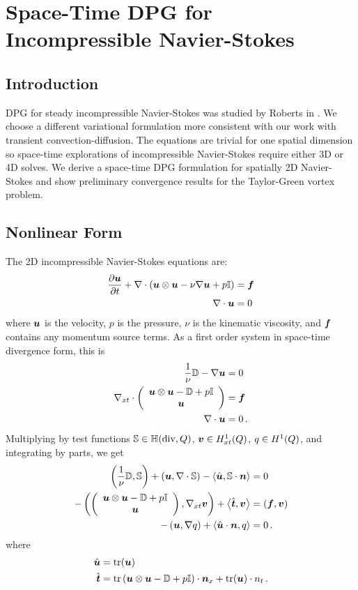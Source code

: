 \documentclass[Dissertation.tex]{subbIles}
\begin{document}
\graphicspath{{../Figures/}}
\chapter{Space-Time DPG for Incompressible Navier-Stokes}
\label{sec:incompressible}

\section{Introduction}
DPG for steady incompressible Navier-Stokes was studied by Roberts in \cite{NateDissertation}.
We choose a different variational formulation more consistent with 
our work with transient convection-diffusion.
The equations are trivial for one spatial dimension so space-time explorations of incompressible
Navier-Stokes require either 3D or 4D solves.
We derive a space-time DPG formulation for spatially 2D Navier-Stokes and show preliminary 
convergence results for the Taylor-Green vortex problem.

\section{Nonlinear Form}
The 2D incompressible Navier-Stokes equations are:
\begin{align*}
  \frac{\partial\boldsymbol u}{\partial t}+\nabla\cdot\left( \boldsymbol u\otimes\boldsymbol u-\nu\nabla\boldsymbol u+p\mathbb{I} \right)&=\boldsymbol f\\
  \nabla\cdot\boldsymbol u&=0
\end{align*}
where $\boldsymbol u$ is the velocity, $p$ is the pressure, $\nu$ is the kinematic viscosity,
and $\boldsymbol f$ contains any momentum source terms.
As a first order system in space-time divergence form, this is
\begin{align*}
  \frac{1}{\nu}\mathbb{D}-\nabla\boldsymbol u&=0\\
  \nabla_{xt}\cdot\left( \begin{array}{c} \boldsymbol u\otimes\boldsymbol u-\mathbb{D}+p\mathbb{I}\\ \boldsymbol u\\ \end{array} \right)&=\boldsymbol f\\
  \nabla\cdot\boldsymbol u&=0\,.
\end{align*}
Multiplying by test functions $\mathbb{S}\in\mathbb{H}(\text{div},Q)$, $\boldsymbol v\in H^{1}_{xt}(Q)$, $q\in H^{1}(Q)$, 
and integrating by parts, we get
\begin{align*}
  \left( \frac{1}{\nu}\mathbb{D},\mathbb{S} \right)
  +\left( \boldsymbol u,\nabla\cdot\mathbb{S} \right)
  -\left\langle \hat{\boldsymbol u},\mathbb{S}\cdot\boldsymbol n \right\rangle&=0\\
  -\left( \left( \begin{array}{c} \boldsymbol u\otimes\boldsymbol u-\mathbb{D}+p\mathbb{I}\\ \boldsymbol u\\ \end{array} \right),\nabla_{xt}\boldsymbol v \right)
  +\left\langle \hat{\boldsymbol t},\boldsymbol v \right\rangle
  &=(\boldsymbol f,\boldsymbol v)\\
  -\left( \boldsymbol u,\nabla q \right)
  +\left\langle \hat{\boldsymbol u}\cdot\boldsymbol n,q \right\rangle&=0\,.
\end{align*}
where
\begin{align*}
\hat{\boldsymbol u}&=\operatorname*{tr}(\boldsymbol u)\\
\hat{\boldsymbol t}&=\operatorname*{tr}\left( \boldsymbol u\otimes\boldsymbol u-\mathbb{D}+p\mathbb{I} \right)\cdot\boldsymbol n_x
+\operatorname*{tr}(\boldsymbol u)\cdot n_t\,.
\end{align*}
\end{document}
